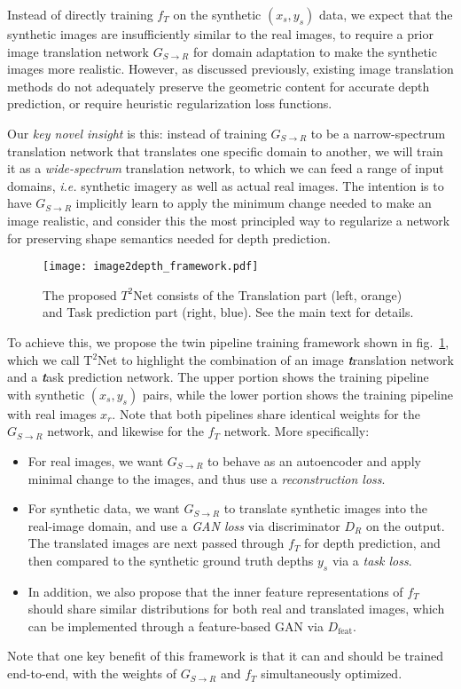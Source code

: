 \documentclass[runningheads]{llncs}
\def\ie{\emph{i.e.}\xspace}
\begin{document}
Instead of directly training $f_T$ on the synthetic $(x_s, y_s)$ data, we expect that the synthetic images are insufficiently similar to the real images, to require a prior image translation network $G_{S\to R}$ for domain adaptation to make the synthetic images more realistic.  However, as discussed previously, existing image translation methods do not adequately preserve the geometric content for accurate depth prediction, or require heuristic regularization loss functions.

Our \emph{key novel insight} is this: instead of training $G_{S\to R}$ to be a narrow-spectrum translation network that translates one specific domain to another, we will train it as a \emph{wide-spectrum} translation network, to which we can feed a range of input domains, \ie synthetic imagery as well as actual real images. The intention is to have $G_{S\to R}$ implicitly learn to apply the minimum change needed to make an image realistic, and consider this the most principled way to regularize a network for preserving shape semantics needed for depth prediction.

\begin{figure}[tb!]
	\centering
	\texttt{[image: image2depth\_framework.pdf]}
	\caption{The proposed $T^2$Net consists of the Translation part (left, orange) and Task prediction part (right, blue). See the main text for details.}
	\label{fig:framework}
\end{figure}

To achieve this, we propose the twin pipeline training framework shown in fig.~\ref{fig:framework}, which we call T$^2$Net to highlight the combination of an image \emph{\textbf{t}}ranslation network and a \emph{\textbf{t}}ask prediction network. The upper portion shows the training pipeline with synthetic $(x_s, y_s)$ pairs, while the lower portion shows the training pipeline with real images $x_r$. Note that both pipelines share identical weights for the $G_{S\to R}$ network, and likewise for the $f_T$ network. More specifically:
\begin{itemize}
	\item For real images, we want $G_{S\to R}$ to behave as an autoencoder and apply minimal change to the images, and thus use a \emph{reconstruction loss}.
	\item For synthetic data, we want $G_{S\to R}$ to translate synthetic images into the real-image domain, and use a \emph{GAN loss} via discriminator $D_R$ on the output. The translated images are next passed through $f_T$ for depth prediction, and then compared to the synthetic ground truth depths $y_s$ via a \emph{task loss}.
	\item In addition, we also propose that the inner feature representations of $f_T$ should share similar distributions for both real and translated images, which can be implemented through a feature-based GAN via $D_{\text{feat}}$. 
\end{itemize}
Note that one key benefit of this framework is that it can and should be trained end-to-end, with the weights of $G_{S\to R}$ and $f_T$ simultaneously optimized.
\end{document}

